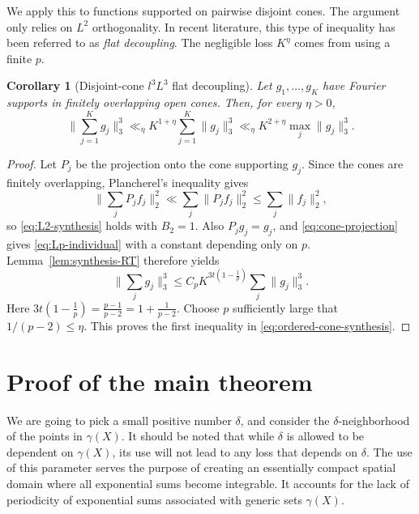 \documentclass{amsart}
\numberwithin{equation}{section}
\newtheorem{corollary}[theorem]{Corollary}
\begin{document}
\medskip

We apply this to functions supported on pairwise disjoint cones. The argument only relies on $L^2$ orthogonality. 
In recent literature, this type of inequality has been referred to as {\em flat decoupling}.
The negligible loss $K^\eta$ comes from using a finite $p$.

\begin{corollary}[Disjoint-cone $l^3L^3$ flat decoupling]\label{cor:ordered-cones}
    Let $g_1,\ldots,g_K$ have Fourier supports in finitely overlapping open cones. Then, for every $\eta>0$,
    \begin{equation}
        \label{eq:ordered-cone-synthesis}
        \Big\|\sum_{j=1}^Kg_j\Big\|_{3}^3
        \ll_\eta K^{1+\eta}\sum_{j=1}^K\|g_j\|_{3}^3
        \ll_\eta K^{2+\eta}\max_j\|g_j\|_{3}^3. 
    \end{equation}
\end{corollary}

\begin{proof}
    Let $P_j$ be the projection onto the cone supporting $g_j$. Since the cones are finitely overlapping, Plancherel's inequality gives
    \[
    \Big\|\sum_jP_jf_j\Big\|_{2}^2\ll\sum_j\|P_jf_j\|_{2}^2\leq\sum_j\|f_j\|_{2}^2,
    \]
    so \eqref{eq:L2-synthesis} holds with $B_2=1$. Also $P_jg_j=g_j$, and \eqref{eq:cone-projection} gives \eqref{eq:Lp-individual} with a constant depending only on $p$. Lemma~\ref{lem:synthesis-RT} therefore yields
    \[
    \Big\|\sum_jg_j\Big\|_{3}^3
    \leq C_pK^{3t(1-\frac{1}{p})}\sum_j\|g_j\|_{3}^3.
    \]
    Here $3t(1-\frac1p)=\frac{p-1}{p-2}=1+\frac1{p-2}$.
    Choose $p$ sufficiently large that $1/(p-2)\leq\eta$. This proves the first inequality in \eqref{eq:ordered-cone-synthesis}.
\end{proof}



\bigskip  

\section{Proof of the main theorem}



We are going to pick a small positive number $\delta$, and consider the $\delta$-neighborhood of the points in $\gamma(X)$.
It should be noted that while $\delta$ is allowed to be dependent on $\gamma(X)$, its use will not lead to any loss that depends on $\delta$. The use of this parameter serves the purpose of creating an essentially compact spatial domain where all exponential sums become integrable. It accounts for the lack of periodicity of exponential sums associated with generic sets $\gamma(X)$.
\end{document}
